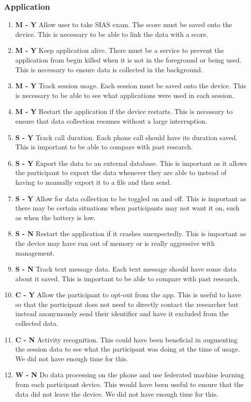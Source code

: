\documentclass{l4proj}
\begin{document}
\subsubsection{Application} \label{mobile-app-reqs}
\begin{enumerate}[start=1,label={\textbf{\arabic* -}}]
    \item \textbf{M - Y} Allow user to take SIAS exam. The score must be saved onto the device. This is necessary to be able to link the data with a score.
    \item \textbf{M - Y} Keep application alive. There must be a service to prevent the application from begin killed when it is not in the foreground or being used. This is necessary to ensure data is collected in the background.
    \item \textbf{M - Y} Track session usage. Each session must be saved onto the device. This is necessary to be able to see what applications were used in each session.
    \item \textbf{M - Y} Restart the application if the device restarts. This is necessary to ensure that data collection resumes without a large interruption.
    \item \textbf{S - Y} Track call duration. Each phone call should have its duration saved. This is important to be able to compare with past research.
    \item \textbf{S - Y} Export the data to an external database. This is important as it allows the participant to export the data whenever they are able to instead of having to manually export it to a file and then send.
    \item \textbf{S - Y} Allow for data collection to be toggled on and off. This is important as there may be certain situations when participants may not want it on, such as when the battery is low.
    \item \textbf{S - N} Restart the application if it crashes unexpectedly. This is important as the device may have run out of memory or is really aggressive with management.
    \item \textbf{S - N} Track text message data. Each text message should have some data about it saved. This is important to be able to compare with past research.
    \item \textbf{C - Y} Allow the participant to opt-out from the app. This is useful to have so that the participant does not need to directly contact the researcher but instead anonymously send their identifier and have it excluded from the collected data.
    \item \textbf{C - N} Activity recognition. This could have been beneficial in augmenting the session data to see what the participant was doing at the time of usage. We did not have enough time for this.
    \item \textbf{W - N} Do data processing on the phone and use federated machine learning from each participant device. This would have been useful to ensure that the data did not leave the device. We did not have enough time for this.
\end{enumerate}
\end{document}
